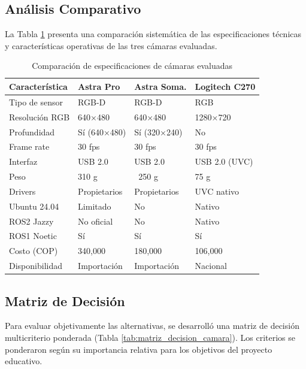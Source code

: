 \subsection{Análisis Comparativo}

La Tabla \ref{tab:comparacion_camaras} presenta una comparación sistemática de las especificaciones técnicas y características operativas de las tres cámaras evaluadas.

\begin{table}[H]
\centering
\caption{Comparación de especificaciones de cámaras evaluadas}
\label{tab:comparacion_camaras}
\small
\begin{tabular}{|l|l|l|l|}
\hline
\textbf{Característica} & \textbf{Astra Pro} & \textbf{Astra Soma.} & \textbf{Logitech C270} \\
\hline
Tipo de sensor & RGB-D & RGB-D & RGB \\
Resolución RGB & 640×480 & 640×480 & 1280×720 \\
Profundidad & Sí (640×480) & Sí (320×240) & No \\
Frame rate & 30 fps & 30 fps & 30 fps \\
Interfaz & USB 2.0 & USB 2.0 & USB 2.0 (UVC) \\
Peso & 310 g & ~250 g & 75 g \\
Drivers & Propietarios & Propietarios & UVC nativo \\
Ubuntu 24.04 & Limitado & No & Nativo \\
ROS2 Jazzy & No oficial & No & Nativo \\
ROS1 Noetic & Sí & Sí & Sí \\
Costo (COP) & 340,000 & 180,000 & 106,000 \\
Disponibilidad & Importación & Importación & Nacional \\
\hline
\end{tabular}
\end{table}

\subsection{Matriz de Decisión}

Para evaluar objetivamente las alternativas, se desarrolló una matriz de decisión multicriterio ponderada (Tabla \ref{tab:matriz_decision_camara}). Los criterios se ponderaron según su importancia relativa para los objetivos del proyecto educativo.

